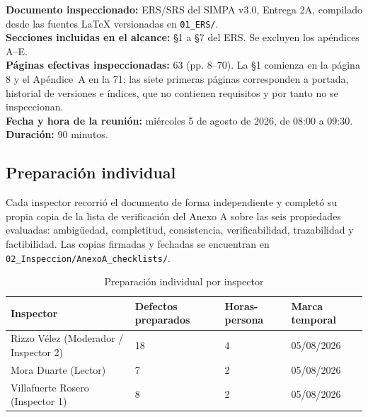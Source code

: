 \documentclass[11pt,letterpaper]{article}
\begin{document}
\noindent\textbf{Documento inspeccionado:} ERS/SRS del SIMPA v3.0, Entrega 2A, compilado desde las fuentes
\LaTeX{} versionadas en \texttt{01\_ERS/}.\\
\textbf{Secciones incluidas en el alcance:} \S1 a \S7 del ERS. Se excluyen los apéndices A--E.\\
\textbf{Páginas efectivas inspeccionadas:} 63 (pp. 8--70). La \S1 comienza en la página 8 y el
Apéndice~A en la 71; las siete primeras páginas corresponden a portada, historial de versiones e
índices, que no contienen requisitos y por tanto no se inspeccionan.\\
\textbf{Fecha y hora de la reunión:} miércoles 5 de agosto de 2026, de 08:00 a 09:30. \textbf{Duración:} {90 minutos}.

\vspace{0.2cm}
\noindent{}

\subsection{Preparación individual}

Cada inspector recorrió el documento de forma independiente y completó su propia copia de la lista
de verificación del Anexo A sobre las seis propiedades evaluadas: ambigüedad, completitud,
consistencia, verificabilidad, trazabilidad y factibilidad. Las copias firmadas y fechadas se
encuentran en \texttt{02\_Inspeccion/AnexoA\_checklists/}.

\begin{table}[H]
\centering
\caption{Preparación individual por inspector}\label{tab:preparacion}
\begin{tabular}{L{4.5cm} L{2.6cm} L{2.6cm} L{3cm}}
\toprule
\textbf{Inspector} & \textbf{Defectos preparados} & \textbf{Horas-persona} & \textbf{Marca temporal}\\
\midrule
Rizzo Vélez (Moderador / Inspector 2) & {18} & {4} & {05/08/2026}\\
Mora Duarte (Lector) & {7} & {2} & {05/08/2026}\\
Villafuerte Rosero (Inspector 1) & {8} & {2} & {05/08/2026}\\
\bottomrule
\end{tabular}
\end{table}
\end{document}
